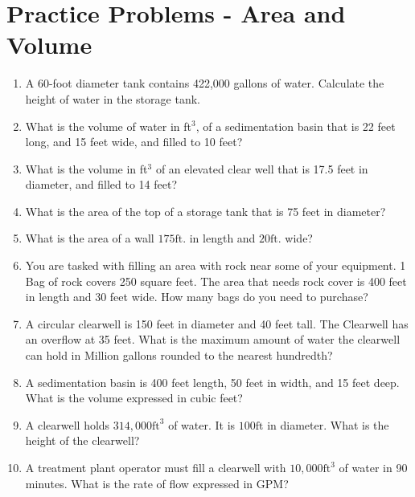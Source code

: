 \section*{Practice Problems - Area and Volume}
\begin{enumerate}

\item A 60-foot diameter tank contains 422,000 gallons of water. Calculate the height of water in the storage tank.

\item What is the volume of water in ft$^3$, of a sedimentation basin that is 22 feet long, and 15 feet wide, and filled to 10 feet?

\item What is the volume in ft$^3$ of an elevated clear well that is 17.5 feet in diameter, and filled to 14 feet?

\item What is the area of the top of a storage tank that is 75 feet in diameter?\\

\item  What is the area of a wall $175 \mathrm{ft}$. in length and $20 \mathrm{ft}$. wide?\\

\item  You are tasked with filling an area with rock near some of your equipment. 1 Bag of rock covers 250 square feet. The area that needs rock cover is 400 feet in length and 30 feet wide. How many bags do you need to purchase?\\

\item A circular clearwell is 150 feet in diameter and 40 feet tall. The Clearwell has an overflow at 35 feet. What is the maximum amount of water the clearwell can hold in Million gallons rounded to the nearest hundredth?\\


\item  A sedimentation basin is 400 feet length, 50 feet in width, and 15 feet deep. What is the volume expressed in cubic feet?\\


\item  A clearwell holds $314,000 \mathrm{ft}^{3}$ of water. It is $100 \mathrm{ft}$ in diameter. What is the height of the clearwell?\\

\item  A treatment plant operator must fill a clearwell with $10,000 \mathrm{ft}^{3}$ of water in 90 minutes. What is the rate of flow expressed in GPM?\\



\end{enumerate}
